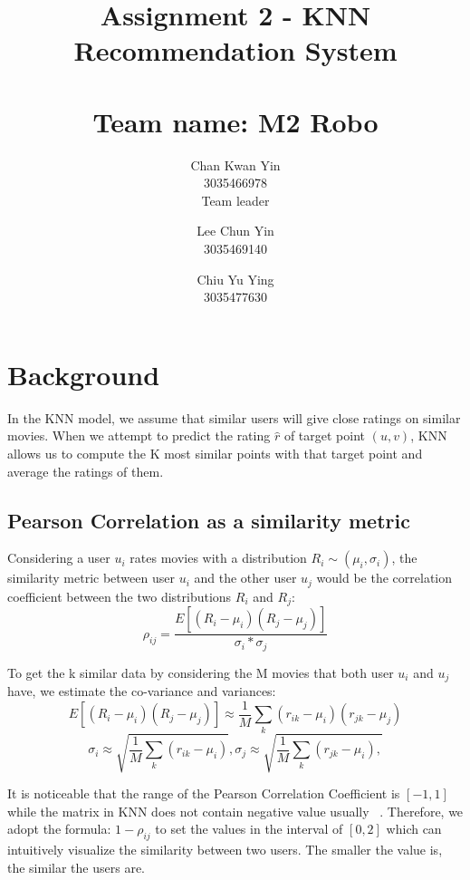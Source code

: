 \documentclass[final]{cvpr}
\begin{document}
\title{
	Assignment 2 - KNN Recommendation System \\~\\
	\large{Team name: M2 Robo}
}

\author{

	Chan Kwan Yin\\
	3035466978 \\
	Team leader
	
	\and

	Lee Chun Yin\\
	3035469140\\
	\and
	Chiu Yu Ying\\
	3035477630

}

\maketitle

\clearpage

\section{Background}

In the KNN model, we assume that similar users will give close ratings on similar movies. When we attempt to predict the rating $\hat{r}$ of target point $(u,v)$, KNN allows us to compute the K most similar points with that target point and average the ratings of them. 

\subsection{Pearson Correlation as a similarity metric}
Considering a user $u_i$ rates movies with a distribution $R_i \sim (\mu_i,\sigma_i)$, the similarity metric between user $u_i$ and the other user $u_j$ would be the correlation coefficient between the two distributions $R_i$ and $R_j :$ $$ \rho_{ij} = \frac{E[(R_i-\mu_i)(R_j-\mu_j)]}{\sigma_i * \sigma_j} $$

To get the k similar data by considering the M movies that both user $u_i$ and $u_j$ have, we estimate the co-variance and variances:
$$ E[(R_i-\mu_i)(R_j-\mu_j)] \approx \frac{1}{M} \sum_k (r_{ik} - \mu_i) (r_{jk} - \mu_j)$$
$$ \sigma_i \approx \sqrt{\frac{1}{M} \sum_k (r_{ik} - \mu_i)} ,
 \sigma_j \approx \sqrt{\frac{1}{M} \sum_k (r_{jk} - \mu_i) ,}$$

It is noticeable that the range of the Pearson Correlation Coefficient is $[-1,1]$ while the matrix in KNN does not contain negative value usually ~\cite{Alpher01}. Therefore, we adopt the formula: $1- \rho_{ij}$ to set the values in the interval of $[0,2]$ which can intuitively visualize the similarity between two users. The smaller the value is, the similar the users are.
\end{document}
